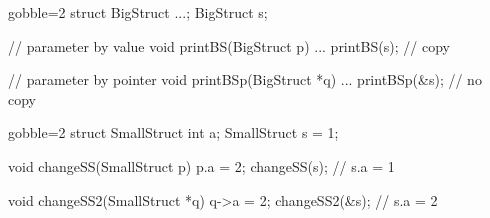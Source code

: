 \begin{frame}[fragile]
  \begin{multicols}{2}
    \begin{cppcode*}{gobble=2}
      struct BigStruct {...};
      BigStruct s;

      // parameter by value
      void printBS(BigStruct p) {
        ...
      }
      printBS(s); // copy

      // parameter by pointer
      void printBSp(BigStruct *q) {
        ...
      }
      printBSp(&s); // no copy
    \end{cppcode*}
    \columnbreak
    \null \vfill
    \vfill \null
  \end{multicols}
\end{frame}

\begin{frame}[fragile]
  \begin{multicols}{2}
    \begin{cppcode*}{gobble=2}
      struct SmallStruct {int a};
      SmallStruct s = {1};

      void changeSS(SmallStruct p) {
        p.a = 2;
      }
      changeSS(s);
      // s.a = 1

      void changeSS2(SmallStruct *q) {
        q->a = 2;
      }
      changeSS2(&s);
      // s.a = 2
    \end{cppcode*}
    \columnbreak
    \null \vfill
    \vfill \null
  \end{multicols}
\end{frame}


